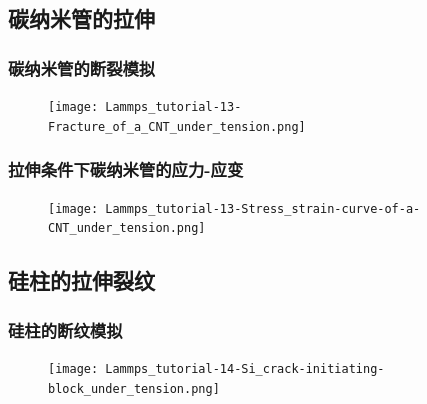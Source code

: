 \subsection{碳纳米管的拉伸}


\frame
{
	\frametitle{碳纳米管的断裂模拟}
\begin{figure}[h!]
\centering
\vskip -5pt
\texttt{[image: Lammps\_tutorial-13-Fracture\_of\_a\_CNT\_under\_tension.png]}
\caption{\fontsize{6.2pt}{5.2pt}}%
\label{LAMMPS_Frcture-of-CNT-under_ternsion}
\end{figure}
}

\frame
{
	\frametitle{拉伸条件下碳纳米管的应力-应变}
\begin{figure}[h!]
\centering
\vskip -5pt
\texttt{[image: Lammps\_tutorial-13-Stress\_strain-curve-of-a-CNT\_under\_tension.png]}
\caption{\fontsize{6.2pt}{5.2pt}}%
\label{LAMMPS_Stress_strain-of-CNT_under_tension}
\end{figure}
}

\subsection{硅柱的拉伸裂纹}

\frame
{
	\frametitle{硅柱的断纹模拟}
\begin{figure}[h!]
\centering
\vskip -15pt
\texttt{[image: Lammps\_tutorial-14-Si\_crack-initiating-block\_under\_tension.png]}
\caption{\fontsize{6.2pt}{5.2pt}}%
\label{LAMMPS_Si_bar-Crack-initiating_block_under_tension}
\end{figure}
}

